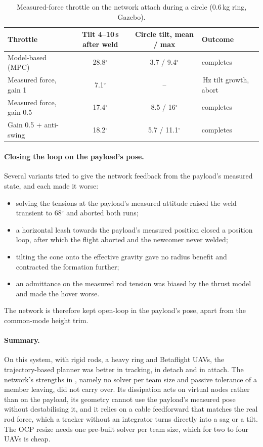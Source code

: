 \begin{table}[h]
\centering
\caption{Measured-force throttle on the network attach during a circle (0.6\,kg ring, Gazebo).}
\label{tab:indi}
\small
\begin{tabularx}{\textwidth}{>{\raggedright\arraybackslash}Xcc>{\raggedright\arraybackslash}X}
\toprule
Throttle & Tilt 4--10\,s after weld & Circle tilt, mean / max & Outcome \\
\midrule
Model-based (MPC) & 28.8$^\circ$ & 3.7 / 9.4$^\circ$ & completes \\
Measured force, gain 1 & 7.1$^\circ$ & -- & 1\,Hz tilt growth, abort \\
Measured force, gain 0.5 & 17.4$^\circ$ & 8.5 / 16$^\circ$ & completes \\
Gain 0.5 + anti-swing & 18.2$^\circ$ & 5.7 / 11.1$^\circ$ & completes \\
\bottomrule
\end{tabularx}
\end{table}

\paragraph{Closing the loop on the payload's pose.} Several variants tried to give the network
feedback from the payload's measured state, and each made it worse:
\begin{itemize}
    \item solving the tensions at the payload's measured attitude raised the weld transient to
    68$^\circ$ and aborted both runs;
    \item a horizontal leash towards the payload's measured position closed a position loop, after
    which the flight aborted and the newcomer never welded;
    \item tilting the cone onto the effective gravity gave no radius benefit and contracted the
    formation further;
    \item an admittance on the measured rod tension was biased by the thrust model and made the
    hover worse.
\end{itemize}
The network is therefore kept open-loop in the payload's pose, apart from the common-mode height
trim.

\paragraph{Summary.} On this system, with rigid rods, a heavy ring and Betaflight UAVs, the
trajectory-based planner was better in tracking, in detach and in attach. The network's strengths in
\cite{quan2025swarm}, namely no solver per team size and passive tolerance of a member leaving, did
not carry over. Its dissipation acts on virtual nodes rather than on the payload, its geometry
cannot use the payload's measured pose without destabilising it, and it relies on a cable feedforward
that matches the real rod force, which a tracker without an integrator turns directly into a sag or
a tilt. The OCP resize needs one pre-built solver per team size, which for two to four UAVs is cheap.
